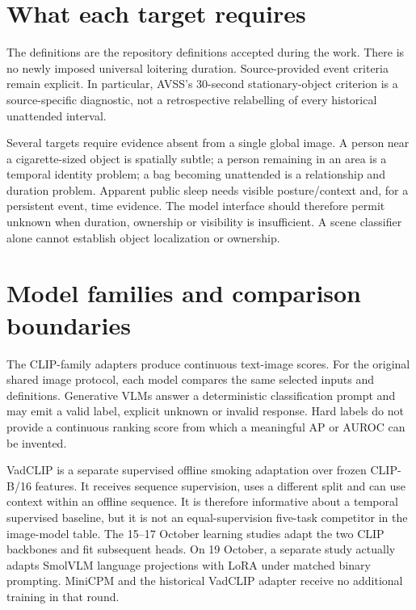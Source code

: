 \section{What each target requires}

The definitions are the repository definitions accepted during the work. There is no newly imposed universal loitering duration. Source-provided event criteria remain explicit. In particular, AVSS's 30-second stationary-object criterion is a source-specific diagnostic, not a retrospective relabelling of every historical unattended interval.

Several targets require evidence absent from a single global image. A person near a cigarette-sized object is spatially subtle; a person remaining in an area is a temporal identity problem; a bag becoming unattended is a relationship and duration problem. Apparent public sleep needs visible posture/context and, for a persistent event, time evidence. The model interface should therefore permit unknown when duration, ownership or visibility is insufficient. A scene classifier alone cannot establish object localization or ownership.

\section{Model families and comparison boundaries}

The CLIP-family adapters produce continuous text-image scores. For the original shared image protocol, each model compares the same selected inputs and definitions. Generative VLMs answer a deterministic classification prompt and may emit a valid label, explicit unknown or invalid response. Hard labels do not provide a continuous ranking score from which a meaningful AP or AUROC can be invented.

VadCLIP is a separate supervised offline smoking adaptation over frozen CLIP-B/16 features. It receives sequence supervision, uses a different split and can use context within an offline sequence. It is therefore informative about a temporal supervised baseline, but it is not an equal-supervision five-task competitor in the image-model table. The 15--17 October learning studies adapt the two CLIP backbones and fit subsequent heads. On 19 October, a separate study actually adapts SmolVLM language projections with LoRA under matched binary prompting. MiniCPM and the historical VadCLIP adapter receive no additional training in that round.


